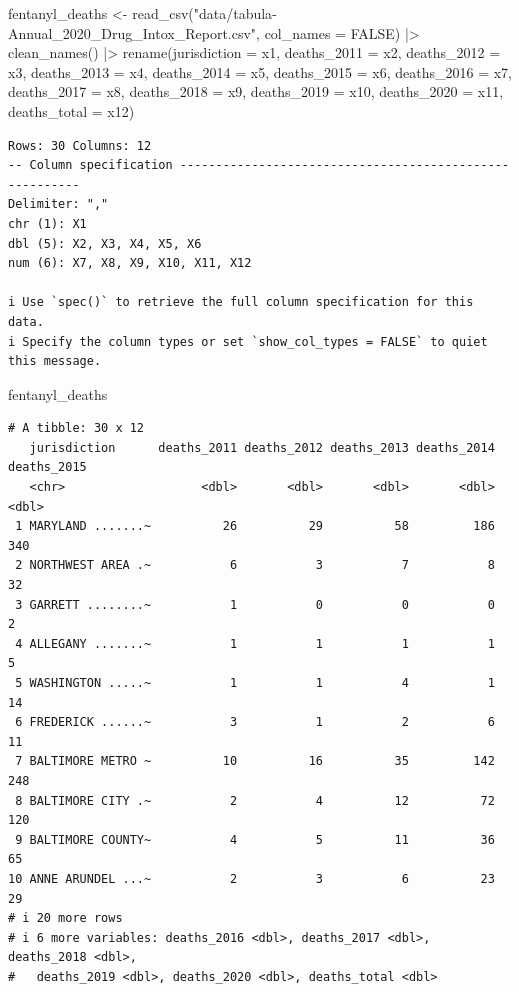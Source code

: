 \documentclass[
  letterpaper,
  DIV=11,
  numbers=noendperiod]{scrreprt}
\newenvironment{Shaded}{\begin{snugshade}}{\end{snugshade}}
\newcommand{\AttributeTok}[1]{\textcolor[rgb]{0.40,0.45,0.13}{#1}}
\newcommand{\ConstantTok}[1]{\textcolor[rgb]{0.56,0.35,0.01}{#1}}
\newcommand{\FunctionTok}[1]{\textcolor[rgb]{0.28,0.35,0.67}{#1}}
\newcommand{\NormalTok}[1]{\textcolor[rgb]{0.00,0.23,0.31}{#1}}
\newcommand{\OtherTok}[1]{\textcolor[rgb]{0.00,0.23,0.31}{#1}}
\newcommand{\SpecialCharTok}[1]{\textcolor[rgb]{0.37,0.37,0.37}{#1}}
\newcommand{\StringTok}[1]{\textcolor[rgb]{0.13,0.47,0.30}{#1}}
\begin{document}
\begin{Shaded}
\begin{Highlighting}[]
\NormalTok{fentanyl\_deaths }\OtherTok{\textless{}{-}} \FunctionTok{read\_csv}\NormalTok{(}\StringTok{"data/tabula{-}Annual\_2020\_Drug\_Intox\_Report.csv"}\NormalTok{, }\AttributeTok{col\_names =} \ConstantTok{FALSE}\NormalTok{) }\SpecialCharTok{|\textgreater{}} 
  \FunctionTok{clean\_names}\NormalTok{() }\SpecialCharTok{|\textgreater{}} 
  \FunctionTok{rename}\NormalTok{(}\AttributeTok{jurisdiction =}\NormalTok{ x1, }\AttributeTok{deaths\_2011 =}\NormalTok{ x2, }\AttributeTok{deaths\_2012 =}\NormalTok{ x3, }\AttributeTok{deaths\_2013 =}\NormalTok{ x4, }\AttributeTok{deaths\_2014 =}\NormalTok{ x5, }\AttributeTok{deaths\_2015 =}\NormalTok{ x6, }\AttributeTok{deaths\_2016 =}\NormalTok{ x7, }\AttributeTok{deaths\_2017 =}\NormalTok{ x8, }
         \AttributeTok{deaths\_2018 =}\NormalTok{ x9, }\AttributeTok{deaths\_2019 =}\NormalTok{ x10, }\AttributeTok{deaths\_2020 =}\NormalTok{ x11, }\AttributeTok{deaths\_total =}\NormalTok{ x12)}
\end{Highlighting}
\end{Shaded}

\begin{verbatim}
Rows: 30 Columns: 12
-- Column specification --------------------------------------------------------
Delimiter: ","
chr (1): X1
dbl (5): X2, X3, X4, X5, X6
num (6): X7, X8, X9, X10, X11, X12

i Use `spec()` to retrieve the full column specification for this data.
i Specify the column types or set `show_col_types = FALSE` to quiet this message.
\end{verbatim}

\begin{Shaded}
\begin{Highlighting}[]
\NormalTok{fentanyl\_deaths}
\end{Highlighting}
\end{Shaded}

\begin{verbatim}
# A tibble: 30 x 12
   jurisdiction      deaths_2011 deaths_2012 deaths_2013 deaths_2014 deaths_2015
   <chr>                   <dbl>       <dbl>       <dbl>       <dbl>       <dbl>
 1 MARYLAND .......~          26          29          58         186         340
 2 NORTHWEST AREA .~           6           3           7           8          32
 3 GARRETT ........~           1           0           0           0           2
 4 ALLEGANY .......~           1           1           1           1           5
 5 WASHINGTON .....~           1           1           4           1          14
 6 FREDERICK ......~           3           1           2           6          11
 7 BALTIMORE METRO ~          10          16          35         142         248
 8 BALTIMORE CITY .~           2           4          12          72         120
 9 BALTIMORE COUNTY~           4           5          11          36          65
10 ANNE ARUNDEL ...~           2           3           6          23          29
# i 20 more rows
# i 6 more variables: deaths_2016 <dbl>, deaths_2017 <dbl>, deaths_2018 <dbl>,
#   deaths_2019 <dbl>, deaths_2020 <dbl>, deaths_total <dbl>
\end{verbatim}
\end{document}
